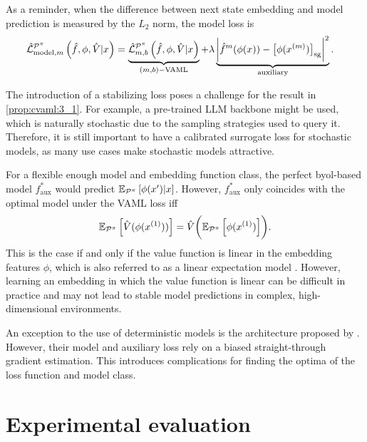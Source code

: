As a reminder, when the difference between next state embedding and model prediction is measured by the $L_2$ norm, the model loss is
\begin{align}
    & \hat{\mathcal{L}}^{\P^\pi}_{\mathrm{model}, m}\left(\hat{f},
\phi, \hat{V}|x\right) = \underbrace{\hat{\mathcal{L}}^{\P^\pi}_{m,b}\left(\hat{f},\phi, \hat{V}|x\right)}_{(m,b)\mathrm{-VAML}} + \lambda \underbrace{\biggl| \hat{f}^m(\phi(x)) - \bigl[\phi(x^{(m)}) \bigr]_{\mathrm{sg}} \biggr|^2}_\mathrm{auxiliary}.
\end{align}

The introduction of a stabilizing loss poses a challenge for the result in \autoref{prop:cvaml:3_1}.
For example, a pre-trained LLM backbone might be used, which is naturally stochastic due to the sampling strategies used to query it.
Therefore, it is still important to have a calibrated surrogate loss for stochastic models, as many use cases make stochastic models attractive.

For a flexible enough model and embedding function class, the perfect \ac{byol}-based model $f^*_\mathrm{aux}$ would predict $\EEX{\P^\pi}{\phi(x')| x}$.
However, $f^*_\mathrm{aux}$ only coincides with the optimal model under the VAML loss iff
\begin{align}
    \EEX{\P^\pi}{\hat{V}(\phi(x^{(1)}))} = \hat{V}\biggl(\EEX{\P^\pi}{\phi(x^{(1)})}\biggr).
\end{align}
This is the case if and only if the value function is linear in the embedding features $\phi$, which is also referred to as a linear expectation model \parencite{wan2019planning}.
However,  learning an embedding in which the value function is linear can be difficult in practice and may not lead to stable model predictions in complex, high-dimensional environments.

An exception to the use of deterministic models is the architecture proposed by \textcite{antonoglou2022planning}.
However, their model and auxiliary loss rely on a biased straight-through gradient estimation.
This introduces complications for finding the optima of the loss function and model class.

\section{Experimental evaluation}
\label{sec:cvaml:latent_experiments}



